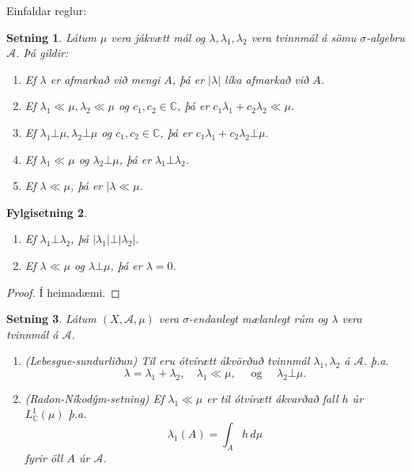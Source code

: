 \documentclass[a4paper,icelandic,11pt]{book}
\theoremstyle{plain}      \newtheorem{setn}{Setning}[chapter]
\newtheorem{fylgi}[setn]{Fylgisetning}
\theoremstyle{definition} \newtheorem{skilgr}[setn]{Skilgreining}
\theoremstyle{remark}     \newtheorem*{ath}{Athugasemd}
\newcommand{\C}{\mathbb C}
\begin{document}
Einfaldar reglur:
\begin{setn}
  Látum $\mu$ vera jákvætt mál og $\lambda,\lambda_{1},\lambda_{2}$
  vera tvinnmál á sömu $\sigma$-algebru $\mathcal A$. Þá gildir:
  \begin{enumerate}[(1)]
  \item Ef $\lambda$ er afmarkað við mengi $A$, þá er $|\lambda|$ líka
    afmarkað við $A$.
  \item Ef $\lambda_{1}\ll\mu, \lambda_{2}\ll\mu$ og
    $c_{1},c_{2}\in\C$, þá er $c_{1}\lambda_{1}+c_{2}\lambda_{2}\ll\mu$.
  \item Ef $\lambda_{1}\bot\mu,\lambda_{2}\bot\mu$ og
    $c_{1},c_{2}\in\C$, þá er $c_{1}\lambda_{1}+c_{2}\lambda_{2}\bot\mu$.
  \item Ef $\lambda_{1}\ll\mu$ og $\lambda_{2}\bot\mu$, þá er
    $\lambda_{1}\bot\lambda_{2}$.
  \item Ef $\lambda\ll\mu$, þá er $|\lambda\ll\mu$.
  \end{enumerate}
\end{setn}
\begin{fylgi}
  \begin{enumerate}[(1)]
  \item Ef $\lambda_{1}\bot\lambda_{2}$, þá
    $|\lambda_{1}|\bot|\lambda_{2}|$.
  \item Ef $\lambda\ll\mu$ og $\lambda\bot\mu$, þá er $\lambda = 0$.
  \end{enumerate}
\end{fylgi}
\begin{proof}
  Í heimadæmi.
\end{proof}
\begin{setn}\label{setn:lebesgue-radon}
  Látum $(X,\mathcal A,\mu)$ vera $\sigma$-endanlegt mælanlegt rúm og
  $\lambda$ vera tvinnmál á $\mathcal A$.
  \begin{enumerate}[(1)]
  \item\emph{(Lebesgue-sundurliðun)}
    Til eru ótvírætt ákvörðuð tvinnmál $\lambda_{1},\lambda_{2}$ á
    $\mathcal A$. þ.a.
    \[
    \lambda = \lambda_{1} + \lambda_{2},
    \quad
    \lambda_{1} \ll \mu,
    \quad\text{ og }\quad
    \lambda_{2}\bot\mu.
    \]
  \item\emph{(Radon-Níkodým-setning)} Ef $\lambda_{1}\ll\mu$ er til
    ótvírætt ákvarðað fall $h$ úr $L^{1}_{\C}(\mu)$ þ.a. 
    \[
    \lambda_{1}(A) = \int_{A} h\,d\mu
    \]
    fyrir öll $A$ úr $\mathcal A$.
  \end{enumerate}
\end{setn}
\end{document}
